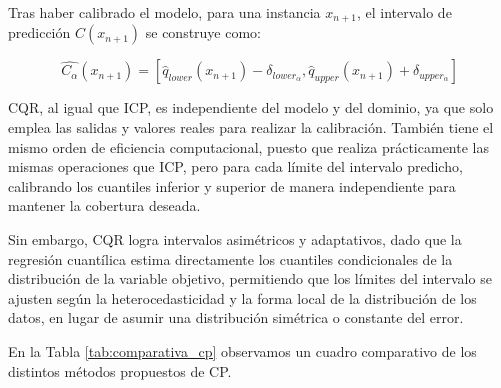 Tras haber calibrado el modelo, para una instancia $x_{n+1}$, el intervalo de predicción $C(x_{n+1})$ se
construye como:

$$
\hat{C_\alpha}(x_{n+1}) = 
        \left[ 
            \hat{q}_{lower}(x_{n+1}) - \delta_{lower_\alpha}, 
            \hat{q}_{upper}(x_{n+1}) + \delta_{upper_\alpha}
        \right]
$$

\acrshort{CQR}, al igual que \acrshort{ICP}, es independiente del modelo y del dominio, ya que solo emplea las salidas y valores reales para realizar la calibración. También tiene el mismo orden de eficiencia computacional, puesto que realiza prácticamente las mismas operaciones que \acrshort{ICP}, pero para cada límite del intervalo predicho, calibrando los cuantiles inferior y superior de manera independiente para mantener la cobertura deseada.

Sin embargo, \acrshort{CQR} logra intervalos asimétricos y adaptativos, dado que la regresión cuantílica estima directamente los cuantiles condicionales de la distribución de la variable objetivo, permitiendo que los límites del intervalo se ajusten según la heterocedasticidad y la forma local de la distribución de los datos, en lugar de asumir una distribución simétrica o constante del error. 

En la Tabla \ref{tab:comparativa_cp} observamos un cuadro comparativo de los distintos métodos propuestos de \acrshort{CP}. 

